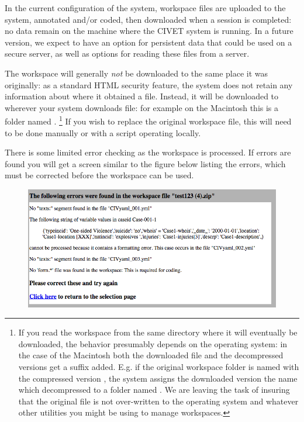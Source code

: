\documentclass[letterpaper,10pt,english]{sphinxmanual}
\begin{document}
In the current configuration of the system, workspace files are uploaded
to the system, annotated and/or coded, then downloaded when a session is
completed: no data remain on the machine where the CIVET system is
running. In a future version, we expect to have an option for persistent
data that could be used on a secure server, as well as options for
reading these files from a server.

The workspace will generally \emph{not} be downloaded to the same place it
was originally: as a standard HTML security feature, the system does not
retain any information about where it obtained a file. Instead, it will
be downloaded to wherever your system downloads file: for example on the
Macintosh this is a folder named . \footnote{
If you read the workspace from the same directory where it will
eventually be downloaded, the behavior presumably depends on the
operating system: in the case of the Macintosh both the downloaded
file and the decompressed versions get a suffix added. E.g. if the
original workspace folder is named  with the compressed
version , the system assigns the downloaded version
the name  which decompressed to a folder named
. We are leaving the task of insuring that the
original file is not over-written to the operating system and
whatever other utilities you might be using to manage workspaces.
} If you wish to
replace the original workspace file, this will need to be done manually
or with a script operating locally.

There is some limited error checking as the workspace is processed. If
errors are found you will get a screen similar to the figure
below listing the errors, which must be corrected before the
workspace can be used.
\begin{figure}[htbp]
\centering

\includegraphics{workspace_errors.png}
\end{figure}
\end{document}
